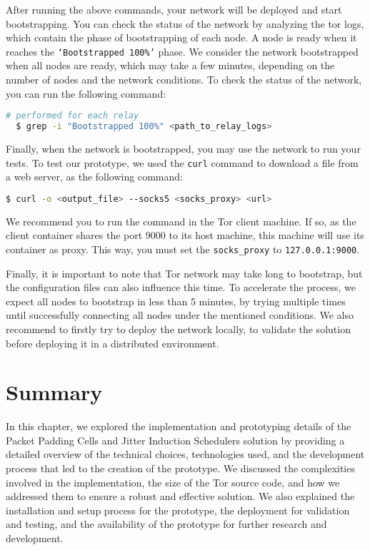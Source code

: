 After running the above commands, your network will be deployed and start bootstrapping. You can check the status of the network by analyzing the tor logs, which contain the phase of bootstrapping of each node. A node is ready when it reaches the \texttt{`Bootstrapped 100\%'} phase. We consider the network bootstrapped when all nodes are ready, which may take a few minutes, depending on the number of nodes and the network conditions. To check the status of the network, you can run the following command:
\begin{lstlisting}[language=bash]
  # performed for each relay
  $ grep -i "Bootstrapped 100%" <path_to_relay_logs> 
\end{lstlisting}

Finally, when the network is bootstrapped, you may use the network to run your tests. To test our prototype, we used the \texttt{curl} command to download a file from a web server, as the following command:
\begin{lstlisting}[language=bash]
  $ curl -o <output_file> --socks5 <socks_proxy> <url>
\end{lstlisting}

We recommend you to run the command in the Tor client machine. If so, as the client container shares the port 9000 to its host machine, this machine will use its container as proxy. This way, you must set the \texttt{socks\_proxy} to \texttt{127.0.0.1:9000}.

Finally, it is important to note that Tor network may take long to bootstrap, but the configuration files can also influence this time. To accelerate the process, we expect all nodes to bootstrap in less than 5 minutes, by trying multiple times until successfully connecting all nodes under the mentioned conditions. We also recommend to firstly try to deploy the network locally, to validate the solution before deploying it in a distributed environment. 

\section{Summary}\label{sec:implementation_summary}
In this chapter, we explored the implementation and prototyping details of the Packet Padding Cells and Jitter Induction Schedulers solution by providing a detailed overview of the technical choices, technologies used, and the development process that led to the creation of the prototype. We discussed the complexities involved in the implementation, the size of the Tor source code, and how we addressed them to ensure a robust and effective solution. We also explained the installation and setup process for the prototype, the deployment for validation and testing, and the availability of the prototype for further research and development.